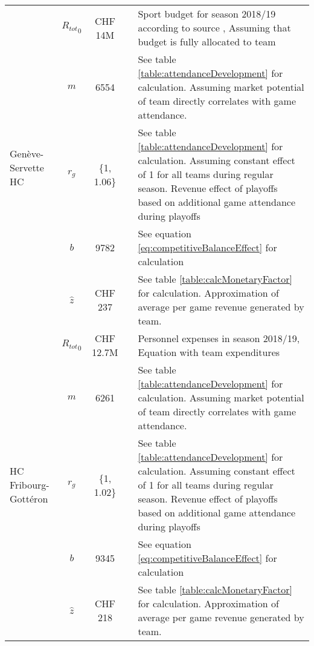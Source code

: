 \begin{longtable}[h!]{p{1.5cm}cc>{\baselineskip=13pt}p{3cm}>{\baselineskip=13pt}p{5.5cm}}
    \multirow[t]{5}{=}{Genève-Servette HC} & ${R_{tot}}_{0}$ & CHF 14M & \cite{emery_retour_2018}                                                    & Sport budget for season 2018/19 according to source , Assuming that budget is fully allocated to team \\ 
                                            & $m$ & 6554 & \cite{national_league_zuschauerzahlen_2022} & See table \ref{table:attendanceDevelopment} for calculation. Assuming market potential of team directly correlates with game attendance. \\
                                            & $r_g$ & \{1, 1.06\} & \cite{national_league_zuschauerzahlen_2022} & See table \ref{table:attendanceDevelopment} for calculation. Assuming constant effect of 1 for all teams during regular season. Revenue effect of playoffs based on additional game attendance during playoffs \\
                                            & $b$ & 9782 &  & See equation \ref{eq:competitiveBalanceEffect} for calculation \\
                                            & $\hat{z}$ & CHF 237 &  & See table \ref{table:calcMonetaryFactor} for calculation. Approximation of average per game revenue generated by team. \\
    \midrule
    
    \multirow[t]{5}{=}{HC Fribourg-Gottéron} & ${R_{tot}}_{0}$ & CHF 12.7M & \cite{hc_fribourg-gotteron_sa_rapport_2019} & Personnel expenses in season 2018/19, Equation with team expenditures \\
                                            & $m$ & 6261 & \cite{national_league_zuschauerzahlen_2022} & See table \ref{table:attendanceDevelopment} for calculation. Assuming market potential of team directly correlates with game attendance. \\
                                            & $r_g$ & \{1, 1.02\} & \cite{national_league_zuschauerzahlen_2022} & See table \ref{table:attendanceDevelopment} for calculation. Assuming constant effect of 1 for all teams during regular season. Revenue effect of playoffs based on additional game attendance during playoffs \\
                                            & $b$ & 9345 &  & See equation \ref{eq:competitiveBalanceEffect} for calculation \\
                                            & $\hat{z}$ & CHF 218 &  & See table \ref{table:calcMonetaryFactor} for calculation. Approximation of average per game revenue generated by team. \\
    \midrule
    

\end{longtable}
